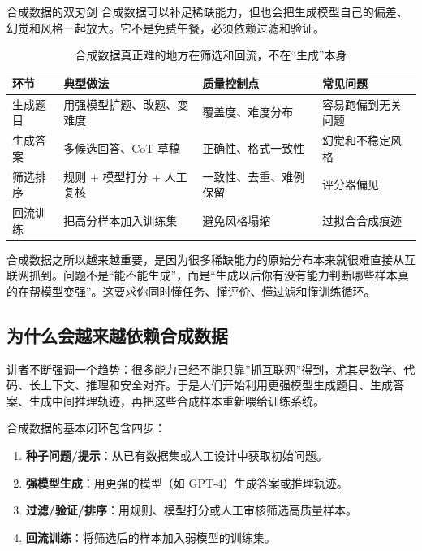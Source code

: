 \begin{warningbox}{合成数据的双刃剑}
合成数据可以补足稀缺能力，但也会把生成模型自己的偏差、幻觉和风格一起放大。它不是免费午餐，必须依赖过滤和验证。
\end{warningbox}

\begin{table}[H]
\centering
\begin{tabular}{p{}p{}p{}p{}}
\toprule
\textbf{环节} & \textbf{典型做法} & \textbf{质量控制点} & \textbf{常见问题} \\
\midrule
生成题目 & 用强模型扩题、改题、变难度 & 覆盖度、难度分布 & 容易跑偏到无关问题 \\
生成答案 & 多候选回答、CoT 草稿 & 正确性、格式一致性 & 幻觉和不稳定风格 \\
筛选排序 & 规则 + 模型打分 + 人工复核 & 一致性、去重、难例保留 & 评分器偏见 \\
回流训练 & 把高分样本加入训练集 & 避免风格塌缩 & 过拟合合成痕迹 \\
\bottomrule
\end{tabular}
\caption{合成数据真正难的地方在筛选和回流，不在“生成”本身}
\end{table}

合成数据之所以越来越重要，是因为很多稀缺能力的原始分布本来就很难直接从互联网抓到。问题不是“能不能生成”，而是“生成以后你有没有能力判断哪些样本真的在帮模型变强”。这要求你同时懂任务、懂评价、懂过滤和懂训练循环。

\subsection{为什么会越来越依赖合成数据}

讲者不断强调一个趋势：很多能力已经不能只靠”抓互联网”得到，尤其是数学、代码、长上下文、推理和安全对齐。于是人们开始利用更强模型生成题目、生成答案、生成中间推理轨迹，再把这些合成样本重新喂给训练系统。

合成数据的基本闭环包含四步：
\begin{enumerate}
    \item \textbf{种子问题/提示}：从已有数据集或人工设计中获取初始问题。
    \item \textbf{强模型生成}：用更强的模型（如 GPT-4）生成答案或推理轨迹。
    \item \textbf{过滤/验证/排序}：用规则、模型打分或人工审核筛选高质量样本。
    \item \textbf{回流训练}：将筛选后的样本加入弱模型的训练集。
\end{enumerate}

